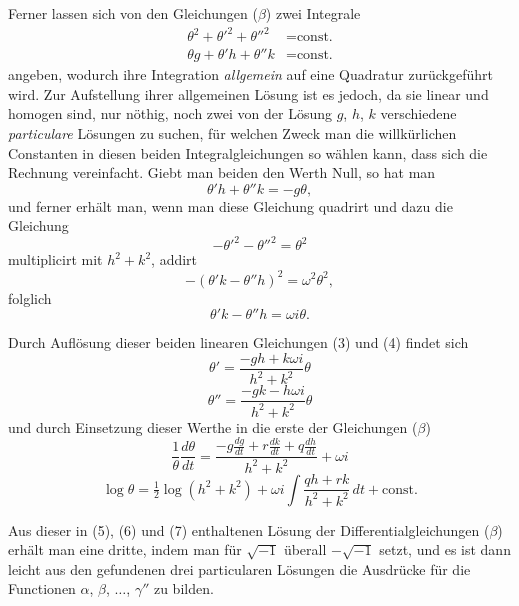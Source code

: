 \documentclass[12pt,a4paper]{book}
\theoremstyle{definition}
\theoremstyle{remark}
\begin{document}
Ferner lassen sich von den Gleichungen ($\beta$) zwei Integrale
\begin{align*}
\tag{IV} \theta^2 + \theta'^2 + \theta''^2 &= \text{const.}\\
\tag{V} \theta g + \theta'h + \theta''k &= \text{const.}
\end{align*}
angeben, wodurch ihre Integration \textit{allgemein} auf eine Quadratur zurückgeführt wird. Zur Aufstellung ihrer allgemeinen Lösung ist es jedoch, da sie linear und homogen sind, nur nöthig, noch zwei von der Lösung $g$, $h$, $k$ verschiedene \textit{particulare} Lösungen zu suchen, für welchen Zweck man die willkürlichen Constanten in diesen beiden Integralgleichungen so wählen kann, dass sich die Rechnung vereinfacht. Giebt man beiden den Werth Null, so hat man
\begin{equation}
\tag{3} \theta'h + \theta''k = -g\theta,
\end{equation}
und ferner erhält man, wenn man diese Gleichung quadrirt und dazu die Gleichung
\[
-\theta'^2 - \theta''^2 = \theta^2
\]
multiplicirt mit $h^2 + k^2$, addirt
\[
-(\theta'k - \theta''h)^2 = \omega^2\theta^2,
\]
folglich
\begin{equation}
\tag{4} \theta'k - \theta''h = \omega i\theta.
\end{equation}

Durch Auflösung dieser beiden linearen Gleichungen (3) und (4) findet sich
\begin{equation}
\tag{5} \theta' = \frac{-gh + k\omega i}{h^2 + k^2}\theta
\end{equation}
\begin{equation}
\tag{6} \theta'' = \frac{-gk - h\omega i}{h^2 + k^2}\theta
\end{equation}
und durch Einsetzung dieser Werthe in die erste der Gleichungen ($\beta$)
\[
\frac{1}{\theta}\frac{d\theta}{dt} = \frac{-g\frac{dg}{dt} + r\frac{dk}{dt} + q\frac{dh}{dt}}{h^2 + k^2} + \omega i
\]
\begin{equation}
\tag{7} \log\theta = \tfrac{1}{2}\log(h^2 + k^2) + \omega i\int\!\frac{qh + rk}{h^2 + k^2}\,dt + \text{const.}
\end{equation}

Aus dieser in (5), (6) und (7) enthaltenen Lösung der Differentialgleichungen ($\beta$) erhält man eine dritte, indem man für $\sqrt{-1}$ überall $-\sqrt{-1}$ setzt, und es ist dann leicht aus den gefundenen drei particularen Lösungen die Ausdrücke für die Functionen $\alpha$, $\beta$, $\ldots$, $\gamma''$ zu bilden.
\end{document}
